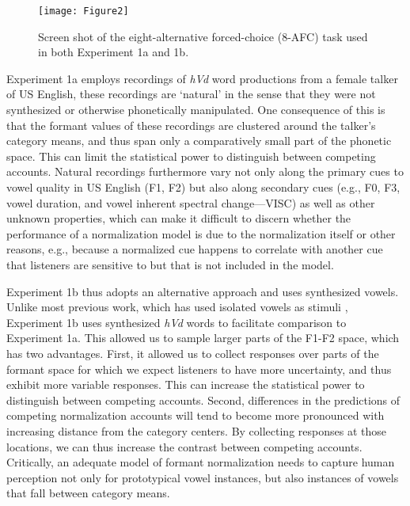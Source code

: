 \documentclass[preprint]{JASA}
\begin{document}
\begin{figure}

{\centering \texttt{[image: Figure2]} 

}

\caption{Screen shot of the eight-alternative forced-choice (8-AFC) task used in both Experiment 1a and 1b.}\label{fig:Figure2}
\end{figure}

Experiment 1a employs recordings of \emph{hVd} word productions from a female talker of US English, these recordings are `natural' in the sense that they were not synthesized or otherwise phonetically manipulated. One consequence of this is that the formant values of these recordings are clustered around the talker's category means, and thus span only a comparatively small part of the phonetic space. This can limit the statistical power to distinguish between competing accounts. Natural recordings furthermore vary not only along the primary cues to vowel quality in US English (F1, F2) but also along secondary cues (e.g., F0, F3, vowel duration, and vowel inherent spectral change---VISC) as well as other unknown properties, which can make it difficult to discern whether the performance of a normalization model is due to the normalization itself or other reasons, e.g., because a normalized cue happens to correlate with another cue that listeners are sensitive to but that is not included in the model.

Experiment 1b thus adopts an alternative approach and uses synthesized vowels. Unlike most previous work, which has used isolated vowels as stimuli \citep{barreda-nearey2012, barreda2021, nearey1989, richter2017}, Experiment 1b uses synthesized \emph{hVd} words to facilitate comparison to Experiment 1a. This allowed us to sample larger parts of the F1-F2 space, which has two advantages. First, it allowed us to collect responses over parts of the formant space for which we expect listeners to have more uncertainty, and thus exhibit more variable responses. This can increase the statistical power to distinguish between competing accounts. Second, differences in the predictions of competing normalization accounts will tend to become more pronounced with increasing distance from the category centers. By collecting responses at those locations, we can thus increase the contrast between competing accounts. Critically, an adequate model of formant normalization needs to capture human perception not only for prototypical vowel instances, but also instances of vowels that fall between category means.
\end{document}
